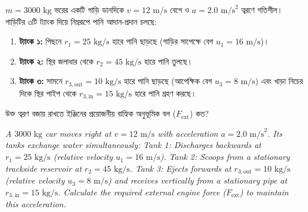\documentclass[12pt, a4paper]{article}
\begin{document}
\begin{tcolorbox}[questionbox={প্রশ্ন (Question) 17}]
\noindent
$m = 3000\text{ kg}$ ভরের একটি গাড়ি ডানদিকে $v = 12\text{ m/s}$ বেগে ও $a = 2.0\text{ m/s}^2$ ত্বরণে গতিশীল। গাড়িটির ৩টি ট্যাংক দিয়ে নিম্নরূপে পানি আদান-প্রদান চলছে: 

\begin{enumerate}
    \item \textbf{ট্যাংক ১:} পিছনে $r_1 = 25\text{ kg/s}$ হারে পানি ছাড়ছে (গাড়ির সাপেক্ষে বেগ $u_1 = 16\text{ m/s}$)।
    \item \textbf{ট্যাংক ২:} স্থির জলাধার থেকে $r_2 = 45\text{ kg/s}$ হারে পানি তুলছে।
    \item \textbf{ট্যাংক ৩:} সামনে $r_{3,\text{out}} = 10\text{ kg/s}$ হারে পানি ছাড়ছে (আপেক্ষিক বেগ $u_3 = 8\text{ m/s}$) এবং খাড়া নিচের দিকে স্থির পাইপ থেকে $r_{3,\text{in}} = 15\text{ kg/s}$ হারে পানি গ্রহণ করছে।
\end{enumerate}

উক্ত ত্বরণ বজায় রাখতে ইঞ্জিনের প্রয়োজনীয় বাহ্যিক অনুভূমিক বল ($F_{\text{ext}}$) কত?

\vspace{0.8em}
\begin{english}
\noindent\textit{\color{darkgray}
A $3000\text{ kg}$ car moves right at $v = 12\text{ m/s}$ with acceleration $a = 2.0\text{ m/s}^2$. Its tanks exchange water simultaneously:
Tank 1: Discharges backwards at $r_1 = 25\text{ kg/s}$ (relative velocity $u_1 = 16\text{ m/s}$).
Tank 2: Scoops from a stationary trackside reservoir at $r_2 = 45\text{ kg/s}$.
Tank 3: Ejects forwards at $r_{3,\text{out}} = 10\text{ kg/s}$ (relative velocity $u_3 = 8\text{ m/s}$) and receives vertically from a stationary pipe at $r_{3,\text{in}} = 15\text{ kg/s}$.
Calculate the required external engine force ($F_{\text{ext}}$) to maintain this acceleration.
}
\end{english}
\end{tcolorbox}
\end{document}
